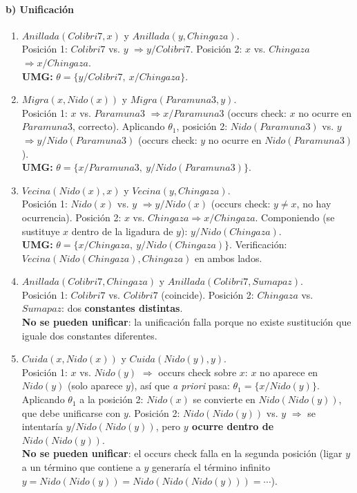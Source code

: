 \paragraph{b) Unificación}

\begin{enumerate}
    \item[b.1.] $Anillada(Colibri7,x)$ y $Anillada(y,Chingaza)$.\\
    Posición 1: $Colibri7$ vs. $y$ $\Rightarrow y/Colibri7$. Posición 2: $x$ vs. $Chingaza$
    $\Rightarrow x/Chingaza$.\\
    \textbf{UMG:} $\theta=\{y/Colibri7,\ x/Chingaza\}$.

    \item[b.2.] $Migra(x,Nido(x))$ y $Migra(Paramuna3,y)$.\\
    Posición 1: $x$ vs. $Paramuna3$ $\Rightarrow x/Paramuna3$ (occurs check: $x$ no ocurre en
    $Paramuna3$, correcto). Aplicando $\theta_1$, posición 2: $Nido(Paramuna3)$ vs. $y$
    $\Rightarrow y/Nido(Paramuna3)$ (occurs check: $y$ no ocurre en $Nido(Paramuna3)$).\\
    \textbf{UMG:} $\theta=\{x/Paramuna3,\ y/Nido(Paramuna3)\}$.

    \item[b.3.] $Vecina(Nido(x),x)$ y $Vecina(y,Chingaza)$.\\
    Posición 1: $Nido(x)$ vs. $y$ $\Rightarrow y/Nido(x)$ (occurs check: $y\neq x$, no hay
    ocurrencia). Posición 2: $x$ vs. $Chingaza \Rightarrow x/Chingaza$. Componiendo (se sustituye
    $x$ dentro de la ligadura de $y$): $y/Nido(Chingaza)$.\\
    \textbf{UMG:} $\theta=\{x/Chingaza,\ y/Nido(Chingaza)\}$. Verificación:
    $Vecina(Nido(Chingaza),Chingaza)$ en ambos lados.

    \item[b.4.] $Anillada(Colibri7,Chingaza)$ y $Anillada(Colibri7,Sumapaz)$.\\
    Posición 1: $Colibri7$ vs. $Colibri7$ (coincide). Posición 2: $Chingaza$ vs. $Sumapaz$: dos
    \textbf{constantes distintas}.\\
    \textbf{No se pueden unificar}: la unificación falla porque no existe sustitución que iguale dos
    constantes diferentes.

    \item[b.5.] $Cuida(x,Nido(x))$ y $Cuida(Nido(y),y)$.\\
    Posición 1: $x$ vs. $Nido(y)$ $\Rightarrow$ occurs check sobre $x$: $x$ no aparece en $Nido(y)$
    (solo aparece $y$), así que \emph{a priori} pasa: $\theta_1=\{x/Nido(y)\}$. Aplicando $\theta_1$
    a la posición 2: $Nido(x)$ se convierte en $Nido(Nido(y))$, que debe unificarse con $y$.
    Posición 2: $Nido(Nido(y))$ vs. $y$ $\Rightarrow$ se intentaría $y/Nido(Nido(y))$, pero
    \textbf{$y$ ocurre dentro de $Nido(Nido(y))$}.\\
    \textbf{No se pueden unificar}: el occurs check falla en la segunda posición (ligar $y$ a un
    término que contiene a $y$ generaría el término infinito $y=Nido(Nido(y))=Nido(Nido(Nido(y)))
    =\cdots$).
\end{enumerate}

